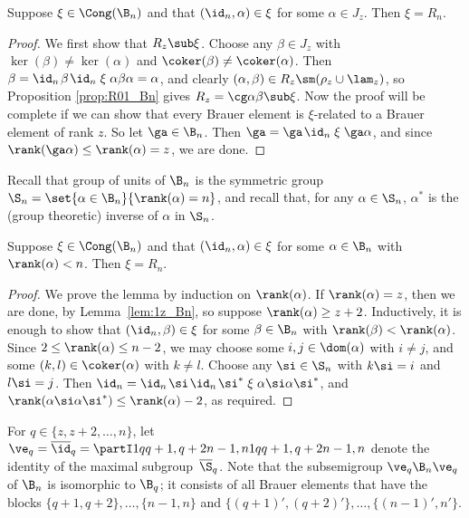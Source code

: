 \begin{lemma}\label{lem:1z_Bn}
Suppose $\xi\in\Cong(\B_n)$ and that $(\id_n,\alpha)\in\xi$ for some $\alpha\in J_z$.  Then $\xi=R_n$.
\end{lemma}

\begin{proof} 
We first show that $R_z\sub\xi$.  
Choose any $\beta\in J_z$ with $\ker(\beta)\not=\ker(\alpha)$ and $\coker(\beta)\not=\coker(\alpha)$.  
Then $\beta=\id_n\;\!\beta\;\!\id_n\mathrel\xi\alpha\beta\alpha=\alpha$,
and clearly $(\alpha,\beta)\in R_z\sm(\rho_z\cup\lam_z)$, so Proposition \ref{prop:R01_Bn} gives $R_z=\cg\alpha\beta\sub\xi$.  
Now 
the proof will be complete if we can show that every Brauer element is $\xi$-related to a Brauer element of rank $z$.  So let $\ga\in\B_n$.  Then $\ga=\ga\;\!\id_n\mathrel\xi\ga\alpha$, and since $\rank(\ga\alpha)\leq\rank(\alpha)=z$, we are done. \end{proof}

Recall that group of units of $\B_n$ is the symmetric group $\S_n=\set{\alpha\in\B_n}{\rank(\alpha)=n}$, and recall  that, for any $\alpha\in\S_n$, $\alpha^*$ is the (group theoretic) inverse of $\alpha$ in $\S_n$.


\begin{lemma}\label{lem:1q_Bn}
Suppose $\xi\in\Cong(\B_n)$ and that $(\id_n,\alpha)\in\xi$ for some $\alpha\in\B_n$ with $\rank(\alpha)<n$.  Then $\xi=R_n$.
\end{lemma}

\begin{proof} We prove the lemma by induction on $\rank(\alpha)$.  If $\rank(\alpha)=z$, then
we are done, by Lemma~\ref{lem:1z_Bn}, so suppose $\rank(\alpha)\geq z+2$.  Inductively, it is enough to show that $(\id_n,\beta)\in\xi$ for some $\beta\in\B_n$ with ${\rank(\beta)<\rank(\alpha)}$.  Since $2\leq\rank(\alpha)\leq n-2$, we may choose some $i,j\in\dom(\alpha)$ with $i\not=j$, and some $(k,l)\in\coker(\alpha)$ with $k\not=l$.  Choose any $\si\in\S_n$ with $k\si=i$ and $l\si=j$.  Then $\id_n = \id_n\;\!\si\;\!\id_n\;\!\si^* \mathrel\xi \alpha\si\alpha\si^*$, and $\rank(\alpha\si\alpha\si^*)\leq\rank(\alpha)-2$, as required. \end{proof}

For $q\in\{z,z+2,\dots,n\}$, let $\ve_q=\overline\id_q=\partI1q{q+1,q+2}{n-1,n}1q{q+1,q+2}{n-1,n}$
denote the identity of the maximal subgroup~$\overline{\S}_q$.  
Note that the subsemigroup $\ve_q\B_n\ve_q$ of $\B_n$ is isomorphic to $\B_q$; it consists of all Brauer elements that have the blocks $\{q+1,q+2\},\ldots,\{n-1,n\}$ and $\{(q+1)',(q+2)'\},\ldots,\{(n-1)',n'\}$.



